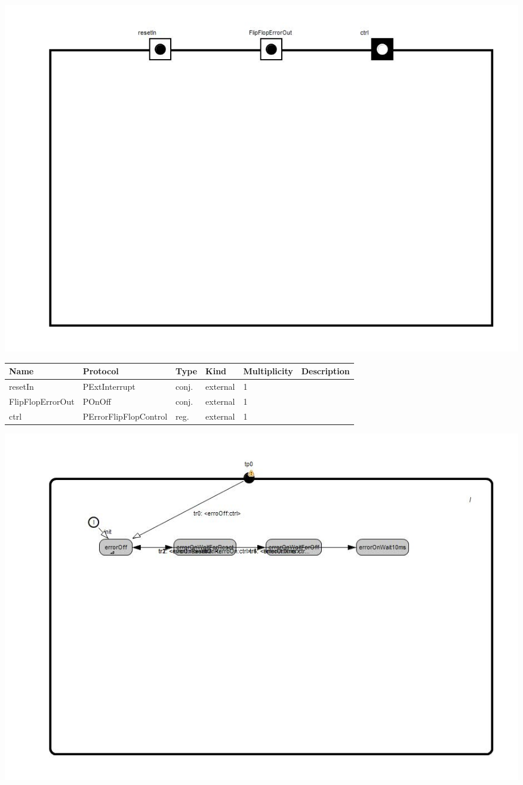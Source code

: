 
{
\centering{}
\includegraphics[width=1.0\textwidth]{./images/AErrorFlipFlop_structure.jpg}
}

\begin{tabular}[ht]{|l|l|l|l|l|p{5cm}|}
\hline
\textbf{Name} & \textbf{Protocol} & \textbf{Type} & \textbf{Kind} & \textbf{Multiplicity} & \textbf{Description}\\
\hline
resetIn & PExtInterrupt & conj. & external & 1 & \\
\hline
FlipFlopErrorOut & POnOff & conj. & external & 1 & \\
\hline
ctrl & PErrorFlipFlopControl & reg. & external & 1 & \\
\hline
\end{tabular}

{
\centering{}
\includegraphics[width=1.0\textwidth]{./images/AErrorFlipFlop_behavior.jpg}
}

\begin{par}

\end{par}



